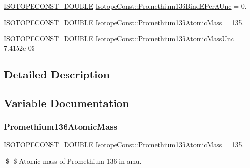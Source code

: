 \begin{DoxyCompactItemize}
\item 
\mbox{\hyperlink{group___isotope_const-_macros_ga8f45a7272ce02c0b4c65c44636ed719a}{I\+S\+O\+T\+O\+P\+E\+C\+O\+N\+S\+T\+\_\+\+D\+O\+U\+B\+LE}} \mbox{\hyperlink{group___isotope_const-_promethium-_pm136_ga5e7644a17e346bbcad67beab40278baa}{Isotope\+Const\+::\+Promethium136\+Bind\+E\+Per\+A\+Unc}} = 0.
\item 
\mbox{\hyperlink{group___isotope_const-_macros_ga8f45a7272ce02c0b4c65c44636ed719a}{I\+S\+O\+T\+O\+P\+E\+C\+O\+N\+S\+T\+\_\+\+D\+O\+U\+B\+LE}} \mbox{\hyperlink{group___isotope_const-_promethium-_pm136_ga9bf742fe1f1b4d40cd42b16e67b00ff6}{Isotope\+Const\+::\+Promethium136\+Atomic\+Mass}} = 135.
\item 
\mbox{\hyperlink{group___isotope_const-_macros_ga8f45a7272ce02c0b4c65c44636ed719a}{I\+S\+O\+T\+O\+P\+E\+C\+O\+N\+S\+T\+\_\+\+D\+O\+U\+B\+LE}} \mbox{\hyperlink{group___isotope_const-_promethium-_pm136_ga98c14eec860474524caeb381ad7db36b}{Isotope\+Const\+::\+Promethium136\+Atomic\+Mass\+Unc}} = 7.\+4152e-\/05
\end{DoxyCompactItemize}


\subsection{Detailed Description}


\subsection{Variable Documentation}
\mbox{\label{group___isotope_const-_promethium-_pm136_ga9bf742fe1f1b4d40cd42b16e67b00ff6}} 
\subsubsection{\texorpdfstring{Promethium136\+Atomic\+Mass}{Promethium136AtomicMass}}
{\footnotesize\ttfamily \mbox{\hyperlink{group___isotope_const-_macros_ga8f45a7272ce02c0b4c65c44636ed719a}{I\+S\+O\+T\+O\+P\+E\+C\+O\+N\+S\+T\+\_\+\+D\+O\+U\+B\+LE}} Isotope\+Const\+::\+Promethium136\+Atomic\+Mass = 135.}

\$ \$ Atomic mass of Promethium-\/136 in amu. \mbox{\label{group___isotope_const-_promethium-_pm136_ga98c14eec860474524caeb381ad7db36b}} 

